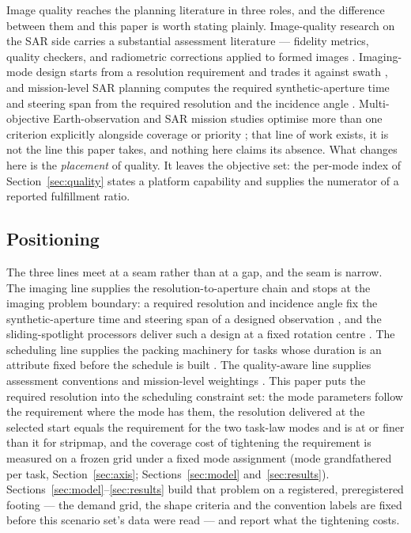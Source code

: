 \documentclass[preprint,authoryear]{elsarticle}
\begin{document}
Image quality reaches the planning literature in three roles, and the difference between them and this paper is worth stating plainly. Image-quality research on the SAR side carries a substantial assessment literature --- fidelity metrics, quality checkers, and radiometric corrections applied to formed images \citep{cumming2005digital,mittermayer2003sliding,prats2010processing}. Imaging-mode design starts from a resolution requirement and trades it against swath \citep{song2025spaceborne}, and mission-level SAR planning computes the required synthetic-aperture time and steering span from the required resolution and the incidence angle \citep{kim2020optimal}. Multi-objective Earth-observation and SAR mission studies optimise more than one criterion explicitly alongside coverage or priority \citep{chang2021integrated,kim2019multi,kim2020optimal}; that line of work exists, it is not the line this paper takes, and nothing here claims its absence. What changes here is the \emph{placement} of quality. It leaves the objective set: the per-mode index of Section~\ref{sec:quality} states a platform capability and supplies the numerator of a reported fulfillment ratio.

\subsection{Positioning}

The three lines meet at a seam rather than at a gap, and the seam is narrow. The imaging line supplies the resolution-to-aperture chain and stops at the imaging problem boundary: a required resolution and incidence angle fix the synthetic-aperture time and steering span of a designed observation \citep{kim2020optimal}, and the sliding-spotlight processors deliver such a design at a fixed rotation centre \citep{mittermayer2003sliding,prats2010processing}. The scheduling line supplies the packing machinery for tasks whose duration is an attribute fixed before the schedule is built \citep{chen2024learning,qin2024multisatellite}. The quality-aware line supplies assessment conventions and mission-level weightings \citep{cumming2005digital,kim2019multi}. This paper puts the required resolution into the scheduling constraint set: the mode parameters follow the requirement where the mode has them, the resolution delivered at the selected start equals the requirement for the two task-law modes and is at or finer than it for stripmap, and the coverage cost of tightening the requirement is measured on a frozen grid under a fixed mode assignment (mode grandfathered per task, Section~\ref{sec:axis}; Sections~\ref{sec:model} and~\ref{sec:results}). Sections~\ref{sec:model}--\ref{sec:results} build that problem on a registered, preregistered footing --- the demand grid, the shape criteria and the convention labels are fixed before this scenario set's data were read --- and report what the tightening costs.
\end{document}
